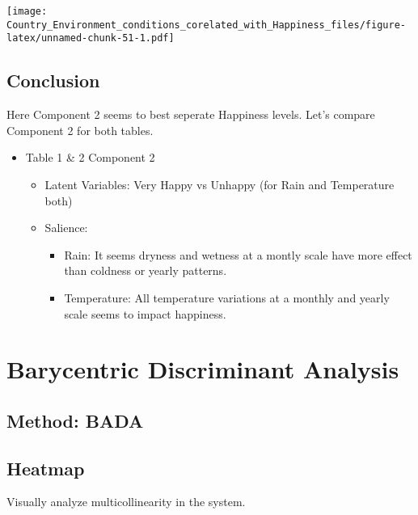\documentclass[]{book}
\providecommand{\tightlist}{%
  \setlength{\itemsep}{0pt}\setlength{\parskip}{0pt}}
\begin{document}
\texttt{[image: Country\_Environment\_conditions\_corelated\_with\_Happiness\_files/figure-latex/unnamed-chunk-51-1.pdf]}

\hypertarget{conclusion-2}{%
\section{Conclusion}\label{conclusion-2}}

Here Component 2 seems to best seperate Happiness levels. Let's compare
Component 2 for both tables.

\begin{itemize}
\tightlist
\item
  Table 1 \& 2 Component 2

  \begin{itemize}
  \tightlist
  \item
    Latent Variables: Very Happy vs Unhappy (for Rain and Temperature
    both)
  \item
    Salience:

    \begin{itemize}
    \tightlist
    \item
      Rain: It seems dryness and wetness at a montly scale have more
      effect than coldness or yearly patterns.
    \item
      Temperature: All temperature variations at a monthly and yearly
      scale seems to impact happiness.
    \end{itemize}
  \end{itemize}
\end{itemize}

\hypertarget{barycentric-discriminant-analysis}{%
\chapter{Barycentric Discriminant
Analysis}\label{barycentric-discriminant-analysis}}

\hypertarget{method-bada}{%
\section{Method: BADA}\label{method-bada}}

\hypertarget{heatmap-1}{%
\section{Heatmap}\label{heatmap-1}}

Visually analyze multicollinearity in the system.
\end{document}
